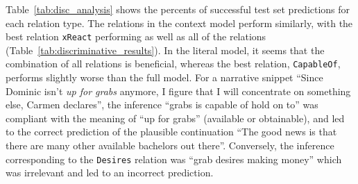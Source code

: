 

Table~\ref{tab:disc_analysis} shows the percents of successful test set predictions for each relation type. The relations in the context model perform similarly, with the best relation \texttt{xReact} performing as well as all of the relations (Table~\ref{tab:discriminative_results}). In the literal model, it seems that the combination of all relations is beneficial, whereas the best relation, \texttt{CapableOf}, performs slightly worse than the full model. For a narrative snippet ``Since Dominic isn't \textit{up for grabs} anymore, I figure that I will concentrate on something else, Carmen declares'', the inference ``grabs is capable of hold on to'' was compliant with the meaning of ``up for grabs'' (available or obtainable), and led to the correct prediction of the plausible continuation ``The good news is that there are many other available bachelors out there''. Conversely, the inference corresponding to the \texttt{Desires} relation was ``grab desires making money'' which was irrelevant and led to an incorrect prediction. 



